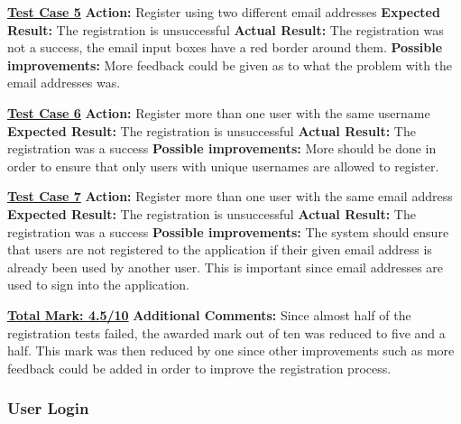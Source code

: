 \documentclass[english]{article}
\begin{document}
\textbf{\underline{Test Case 5}}\newline
\textbf{Action:} Register using two different email addresses\newline
\textbf{Expected Result:} The registration is unsuccessful\newline
\textbf{Actual Result:} The registration was not a success, the email input boxes have a red border around them.\newline
\textbf{Possible improvements:} More feedback could be given as to what the problem with the email addresses was.\newline

\textbf{\underline{Test Case 6}}\newline
\textbf{Action:} Register more than one user with the same username\newline
\textbf{Expected Result:} The registration is unsuccessful\newline
\textbf{Actual Result:} The registration was a success\newline
\textbf{Possible improvements:} More should be done in order to ensure that only users with unique usernames are allowed to register.\newline

\textbf{\underline{Test Case 7}}\newline
\textbf{Action:} Register more than one user with the same email address\newline
\textbf{Expected Result:} The registration is unsuccessful\newline
\textbf{Actual Result:} The registration was a success\newline
\textbf{Possible improvements:} The system should ensure that users are not registered to the application if their given email address is already been used by another user. This is important since email addresses are used to sign into the application.\newline\newline

\textbf{\underline{Total Mark: 4.5/10}}\newline
\textbf{Additional Comments:} Since almost half of the registration tests failed, the awarded mark out of ten was reduced to five and a half. This mark was then reduced by one since other improvements such as more feedback could be added in order to improve the registration process. \newline

\subsubsection{User Login}
\end{document}
